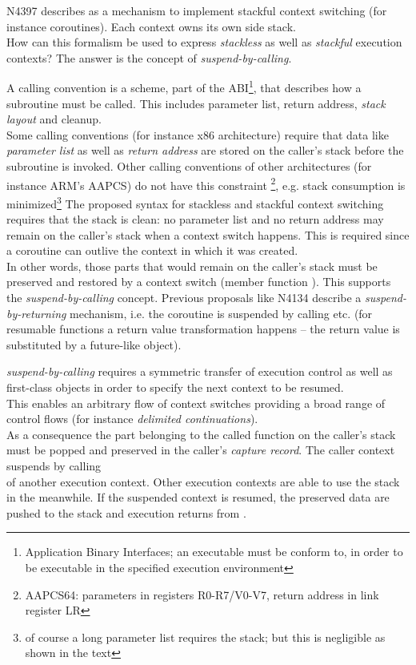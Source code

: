 N4397\cite{N4397} describes \ectx as a mechanism to implement stackful context
switching (for instance coroutines). Each context owns its own side stack.\\
How can this formalism be used to express \emph{stackless} as well as
\emph{stackful} execution contexts? The answer is the concept of
\emph{suspend-by-calling}.

A calling convention is a scheme, part of the ABI\footnote{Application Binary
Interfaces; an executable must be conform to, in order to be executable in the
specified execution environment}, that describes how a subroutine must be
called. This includes parameter list, return address, \emph{stack layout} and
cleanup.\\
Some calling conventions (for instance x86 architecture) require that data like
\emph{parameter list} as well as \emph{return address} are stored on the caller's
stack before the subroutine is invoked. Other calling conventions of other
architectures (for instance ARM's AAPCS) do not have this constraint
\footnote{AAPCS64: parameters in registers R0-R7/V0-V7, return address in link
register LR}, e.g. stack consumption is minimized\footnote{of course a long
parameter list requires the stack; but this is negligible as shown in the text}
\newline
The proposed syntax for stackless and stackful context switching requires that
the stack is clean: no parameter list and no return address may remain on the
caller's stack when a context switch happens. This is required since a
coroutine can outlive the context in which it was created.\\
In other words, those parts that would remain on the caller's stack must be
preserved and restored by a context switch (member function \ectxop). This
supports the \emph{suspend-by-calling} concept. Previous proposals like
N4134\cite{N4134} describe a \emph{suspend-by-returning} mechanism, i.e. the
coroutine is suspended by calling \yield etc. (for resumable functions a return
value transformation happens -- the return value is substituted by a future-like
object).

\emph{suspend-by-calling} requires a symmetric transfer of execution control
as well as first-class objects in order to specify the next context to be
resumed.\\
This enables an arbitrary flow of context switches providing a broad range of
control flows (for instance \emph{delimited continuations}).\\
As a consequence the part belonging to the called function on the caller's stack
must be popped and preserved in the caller's \emph{capture record}. The caller
context suspends by calling\\
\ectxop of another execution context. Other execution contexts are able to use
the stack in the meanwhile. If the suspended context is resumed, the preserved
data are pushed to the stack and execution returns from \ectxop.


